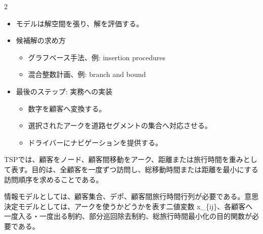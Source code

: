 \clearpage
{}
\begin{multicols}{2}\footnotesize\raggedcolumns
{}
\begin{itemize}
\item モデルは解空間を張り、解を評価する。
\item 候補解の求め方
\begin{itemize}
\item グラフベース手法、例: insertion procedures
\item 混合整数計画、例: branch and bound
\end{itemize}
\item 最後のステップ: 実務への実装
\begin{itemize}
\item 数字を顧客へ変換する。
\item 選択されたアークを道路セグメントの集合へ対応させる。
\item ドライバーにナビゲーションを提供する。
\end{itemize}
\end{itemize}
TSPでは、顧客をノード、顧客間移動をアーク、距離または旅行時間を重みとして表す。目的は、全顧客を一度ずつ訪問し、総移動時間または距離を最小にする訪問順序を求めることである。\par

情報モデルとしては、顧客集合、デポ、顧客間旅行時間行列が必要である。意思決定モデルとしては、アークを使うかどうかを表す二値変数 x\_\{ij\}、各顧客へ一度入る・一度出る制約、部分巡回除去制約、総旅行時間最小化の目的関数が必要である。\par


\end{multicols}
